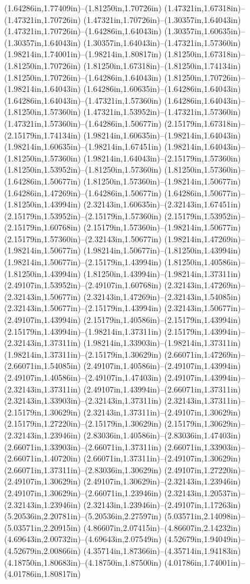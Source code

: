 (1.64286in,1.77409in)--(1.81250in,1.70726in) (1.47321in,1.67318in)--(1.47321in,1.70726in) (1.47321in,1.70726in)--(1.30357in,1.64043in) (1.47321in,1.70726in)--(1.64286in,1.64043in) (1.30357in,1.60635in)--(1.30357in,1.64043in) (1.30357in,1.64043in)--(1.47321in,1.57360in) (1.98214in,1.74001in)--(1.98214in,1.80817in) (1.81250in,1.67318in)--(1.81250in,1.70726in) (1.81250in,1.67318in)--(1.81250in,1.74134in) (1.81250in,1.70726in)--(1.64286in,1.64043in) (1.81250in,1.70726in)--(1.98214in,1.64043in) (1.64286in,1.60635in)--(1.64286in,1.64043in) (1.64286in,1.64043in)--(1.47321in,1.57360in) (1.64286in,1.64043in)--(1.81250in,1.57360in) (1.47321in,1.53952in)--(1.47321in,1.57360in) (1.47321in,1.57360in)--(1.64286in,1.50677in) (2.15179in,1.67318in)--(2.15179in,1.74134in) (1.98214in,1.60635in)--(1.98214in,1.64043in) (1.98214in,1.60635in)--(1.98214in,1.67451in) (1.98214in,1.64043in)--(1.81250in,1.57360in) (1.98214in,1.64043in)--(2.15179in,1.57360in) (1.81250in,1.53952in)--(1.81250in,1.57360in) (1.81250in,1.57360in)--(1.64286in,1.50677in) (1.81250in,1.57360in)--(1.98214in,1.50677in) (1.64286in,1.47269in)--(1.64286in,1.50677in) (1.64286in,1.50677in)--(1.81250in,1.43994in) (2.32143in,1.60635in)--(2.32143in,1.67451in) (2.15179in,1.53952in)--(2.15179in,1.57360in) (2.15179in,1.53952in)--(2.15179in,1.60768in) (2.15179in,1.57360in)--(1.98214in,1.50677in) (2.15179in,1.57360in)--(2.32143in,1.50677in) (1.98214in,1.47269in)--(1.98214in,1.50677in) (1.98214in,1.50677in)--(1.81250in,1.43994in) (1.98214in,1.50677in)--(2.15179in,1.43994in) (1.81250in,1.40586in)--(1.81250in,1.43994in) (1.81250in,1.43994in)--(1.98214in,1.37311in) (2.49107in,1.53952in)--(2.49107in,1.60768in) (2.32143in,1.47269in)--(2.32143in,1.50677in) (2.32143in,1.47269in)--(2.32143in,1.54085in) (2.32143in,1.50677in)--(2.15179in,1.43994in) (2.32143in,1.50677in)--(2.49107in,1.43994in) (2.15179in,1.40586in)--(2.15179in,1.43994in) (2.15179in,1.43994in)--(1.98214in,1.37311in) (2.15179in,1.43994in)--(2.32143in,1.37311in) (1.98214in,1.33903in)--(1.98214in,1.37311in) (1.98214in,1.37311in)--(2.15179in,1.30629in) (2.66071in,1.47269in)--(2.66071in,1.54085in) (2.49107in,1.40586in)--(2.49107in,1.43994in) (2.49107in,1.40586in)--(2.49107in,1.47403in) (2.49107in,1.43994in)--(2.32143in,1.37311in) (2.49107in,1.43994in)--(2.66071in,1.37311in) (2.32143in,1.33903in)--(2.32143in,1.37311in) (2.32143in,1.37311in)--(2.15179in,1.30629in) (2.32143in,1.37311in)--(2.49107in,1.30629in) (2.15179in,1.27220in)--(2.15179in,1.30629in) (2.15179in,1.30629in)--(2.32143in,1.23946in) (2.83036in,1.40586in)--(2.83036in,1.47403in) (2.66071in,1.33903in)--(2.66071in,1.37311in) (2.66071in,1.33903in)--(2.66071in,1.40720in) (2.66071in,1.37311in)--(2.49107in,1.30629in) (2.66071in,1.37311in)--(2.83036in,1.30629in) (2.49107in,1.27220in)--(2.49107in,1.30629in) (2.49107in,1.30629in)--(2.32143in,1.23946in) (2.49107in,1.30629in)--(2.66071in,1.23946in) (2.32143in,1.20537in)--(2.32143in,1.23946in) (2.32143in,1.23946in)--(2.49107in,1.17263in) (5.20536in,2.20781in)--(5.20536in,2.27597in) (5.03571in,2.14098in)--(5.03571in,2.20915in) (4.86607in,2.07415in)--(4.86607in,2.14232in) (4.69643in,2.00732in)--(4.69643in,2.07549in) (4.52679in,1.94049in)--(4.52679in,2.00866in) (4.35714in,1.87366in)--(4.35714in,1.94183in) (4.18750in,1.80683in)--(4.18750in,1.87500in) (4.01786in,1.74001in)--(4.01786in,1.80817in) 